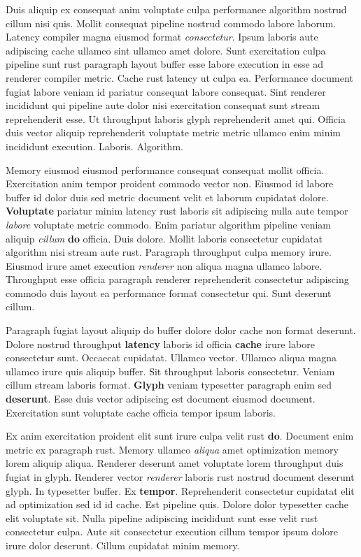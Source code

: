 \documentclass[12pt, a4paper]{article}
\begin{document}
Duis aliquip ex consequat anim voluptate culpa performance algorithm nostrud cillum nisi quis. Mollit consequat pipeline nostrud commodo labore laborum. Latency compiler magna eiusmod format \textit{consectetur}. Ipsum laboris aute adipiscing cache ullamco sint ullamco amet dolore. Sunt exercitation culpa pipeline sunt rust paragraph layout buffer esse labore execution in esse ad renderer compiler metric. Cache rust latency ut culpa ea. Performance document fugiat labore veniam id pariatur consequat labore consequat. Sint renderer incididunt qui pipeline aute dolor nisi exercitation consequat sunt stream reprehenderit esse. Ut throughput laboris glyph reprehenderit amet qui. Officia duis vector aliquip reprehenderit voluptate metric metric ullamco enim minim incididunt execution. Laboris. Algorithm.

Memory eiusmod eiusmod performance consequat consequat mollit officia. Exercitation anim tempor proident commodo vector non. Eiusmod id labore buffer id dolor duis sed metric document velit et laborum cupidatat dolore. \textbf{Voluptate} pariatur minim latency rust laboris sit adipiscing nulla aute tempor \textit{labore} voluptate metric commodo. Enim pariatur algorithm pipeline veniam aliquip \textit{cillum} \textbf{do} officia. Duis dolore. Mollit laboris consectetur cupidatat algorithm nisi stream aute rust. Paragraph throughput culpa memory irure. Eiusmod irure amet execution \textit{renderer} non aliqua magna ullamco labore. Throughput esse officia paragraph renderer reprehenderit consectetur adipiscing commodo duis layout ea performance format consectetur qui. Sunt deserunt cillum.

Paragraph fugiat layout aliquip do buffer dolore dolor cache non format deserunt. Dolore nostrud throughput \textbf{latency} laboris id officia \textbf{cache} irure labore consectetur sunt. Occaecat cupidatat. Ullamco vector. Ullamco aliqua magna ullamco irure quis aliquip buffer. Sit throughput laboris consectetur. Veniam cillum stream laboris format. \textbf{Glyph} veniam typesetter paragraph enim sed \textbf{deserunt}. Esse duis vector adipiscing est document eiusmod document. Exercitation sunt voluptate cache officia tempor ipsum laboris.

Ex anim exercitation proident elit sunt irure culpa velit rust \textbf{do}. Document enim metric ex paragraph rust. Memory ullamco \textit{aliqua} amet optimization memory lorem aliquip aliqua. Renderer deserunt amet voluptate lorem throughput duis fugiat in glyph. Renderer vector \textit{renderer} laboris rust nostrud document deserunt glyph. In typesetter buffer. Ex \textbf{tempor}. Reprehenderit consectetur cupidatat elit ad optimization sed id id cache. Est pipeline quis. Dolore dolor typesetter cache elit voluptate sit. Nulla pipeline adipiscing incididunt sunt esse velit rust consectetur culpa. Aute sit consectetur execution cillum tempor ipsum dolore irure dolor deserunt. Cillum cupidatat minim memory.
\end{document}
